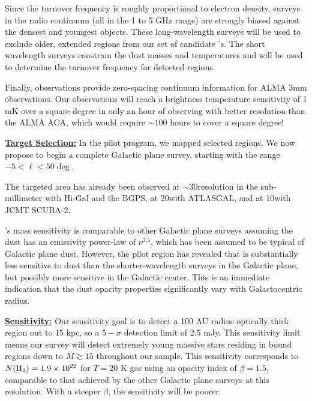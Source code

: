 \documentclass[11pt,preprint]{aastex_nofoot}
\begin{document}
Since the turnover frequency is roughly proportional to electron density,
surveys in the radio continuum (all in the 1 to 5 GHz range) are strongly
biased against the densest and youngest objects.  These long-wavelength surveys
will be used to exclude older, extended \uchii regions from our set of
candidate \hchii's.  The short wavelength surveys constrain the dust masses and
temperatures and will be used to determine the turnover frequency for detected
\hchii regions.

Finally, \MUSTANG observations provide zero-spacing
continuum information for ALMA 3mm observations.  Our observations will reach a
brightness temperature sensitivity of 1 mK over a square degree in only an hour
of observing with better resolution than the ALMA ACA, which would require
$\sim100$ hours to cover a square degree!  

\indent\underline{\textbf{\helv Target Selection:}}
In the pilot program, we mapped selected regions.  We now propose to begin a complete
Galactic plane survey, starting with the range $-5 < \ell < 50\deg$.

The targeted area has already been observed at $\sim$30\arcsec resolution in
the sub-millimeter with Hi-Gal and the BGPS, at 20\arcsec with ATLASGAL, and at
10\arcsec with JCMT SCUBA-2.  

\MUSTANG’s mass sensitivity is comparable to other Galactic plane surveys assuming the
dust has an emissivity power-law of $\nu^{3.5}$, which has been assumed to be
typical of Galactic plane
dust.  However, the pilot region has revealed that \MUSTANG is substantially
less sensitive to dust than the shorter-wavelength surveys in the Galactic plane,
but possibly more sensitive in the Galactic center.  This is an immediate
indication that the dust opacity properties significantly vary with Galactocentric
radius.

\indent\underline{\textbf{\helv Sensitivity:}}  Our sensitivity goal is to
detect a 100 AU radius optically thick \hii region out to 15 kpc, so a
$5-\sigma$ detection limit of 2.5 mJy.  This sensitivity limit means our survey
will detect extremely young massive stars residing in bound \hii regions down
to $M \gtrsim 15$ \msun throughout our sample.  This sensitivity corresponds to
$N(\textrm{H}_{2})=1.9\times10^{22}$ \persc for $T=20$ K gas using an opacity index of
$\beta=1.5$, comparable to that achieved by the other Galactic plane surveys at
this resolution.  With a steeper $\beta$, the sensitivity will be poorer.
\end{document}
